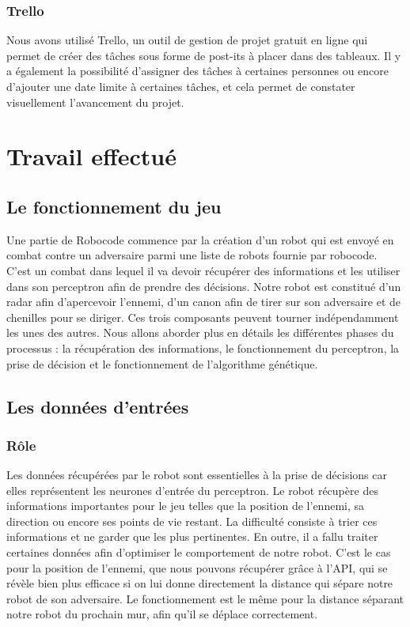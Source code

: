 \documentclass[12pt]{article}
\begin{document}
\subsubsection{Trello}
Nous avons utilisé Trello, un outil de gestion de projet gratuit en ligne qui permet de créer des tâches sous forme de post-its à placer dans des tableaux. Il y a également la possibilité d'assigner des tâches à certaines personnes ou encore d'ajouter une date limite à certaines tâches, et cela permet de constater visuellement l'avancement du projet.

\newpage

\section{Travail effectué}
\subsection{Le fonctionnement du jeu}
Une partie de Robocode commence par la création d'un robot qui est envoyé en combat contre un adversaire parmi une liste de robots fournie par robocode. C'est un combat dans lequel il va devoir récupérer des informations et les utiliser dans son perceptron afin de prendre des décisions. Notre robot est constitué d'un radar afin d'apercevoir l'ennemi, d'un canon afin de tirer sur son adversaire et de chenilles pour se diriger. Ces trois composants peuvent tourner indépendamment les unes des autres. Nous allons aborder plus en détails les différentes phases du processus : la récupération des informations, le fonctionnement du perceptron, la prise de décision et le fonctionnement de l'algorithme génétique.

\subsection{Les données d'entrées}

\subsubsection{Rôle}
Les données récupérées par le robot sont essentielles à la prise de décisions car elles représentent les neurones d'entrée du perceptron. Le robot récupère des informations importantes pour le jeu telles que la position de l'ennemi, sa direction ou encore ses points de vie restant. La difficulté consiste à trier ces informations et ne garder que les plus pertinentes. En outre, il a fallu traiter certaines données afin d'optimiser le comportement de notre robot. C'est le cas pour la position de l'ennemi, que nous pouvons récupérer grâce à l'API, qui se révèle bien plus efficace si on lui donne directement la distance qui sépare notre robot de son adversaire. Le fonctionnement est le même pour la distance séparant notre robot du prochain mur, afin qu'il se déplace correctement.
\end{document}
